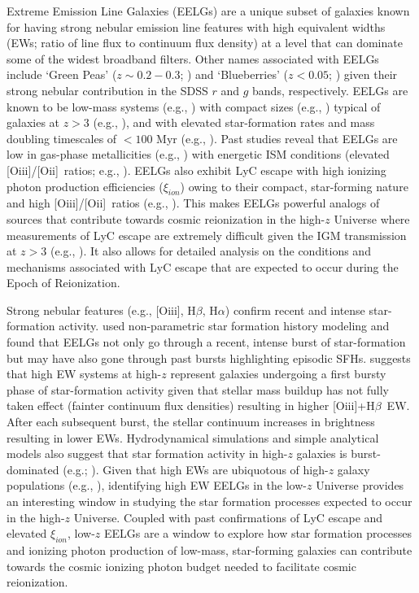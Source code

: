\documentclass[twocolumn,tight,times,linenumbers]{aastex631}
\newcommand{\halpha}{H$\alpha$}
\newcommand{\hbeta}{H$\beta$}
\newcommand{\oii}{[O{\sc ii}]}
\newcommand{\oiii}{[O{\sc iii}]}
\newcommand{\xiion}{$\xi_{ion}$}
\begin{document}
            Extreme Emission Line Galaxies (EELGs) are a unique subset of galaxies known for having strong nebular emission line features with high equivalent widths (EWs; ratio of line flux to continuum flux density) at a level that can dominate some of the widest broadband filters. Other names associated with EELGs include `Green Peas' ($z \sim 0.2 - 0.3$; \citealt{Cardamone2009,Izotov2011}) and `Blueberries' ($z < 0.05$; \citealt{Yang2017_BB}) given their strong nebular contribution in the SDSS $r$ and $g$ bands, respectively. EELGs are known to be low-mass systems (e.g., \citealt{Maseda2014,Amorin2015,Forrest2017,Yang2017_BB}) with compact sizes (e.g., \citealt{vanderWel2011,Amorin2015,Forrest2017,Yang2017_GP_sizes,Kim2021}) typical of galaxies at $z > 3$ (e.g., \citealt{Yang2022_Lilan,Ormerod2024}), and with elevated star-formation rates and mass doubling timescales of $< 100$ Myr (e.g., \citealt{Atek2011, Maseda2013, Atek2014, Amorin2015}). Past studies reveal that EELGs are low in gas-phase metallicities (e.g., \citealt{Amorin2014_VUDS,Amorin2014_highz,Jiang2019}) with energetic ISM conditions (elevated \oiii/\oii~ratios; e.g., \citealt{Izotov2018,Paalvast2018,Izotov2021_O32}). EELGs also exhibit LyC escape with high ionizing photon production efficiencies (\xiion) owing to their compact, star-forming nature and high \oiii/\oii~ratios (e.g., \citealt{Schaerer2016,Tang2019,Emami2020,Atek2022}). This makes EELGs powerful analogs of sources that contribute towards cosmic reionization in the high-$z$ Universe where measurements of LyC escape are extremely difficult given the IGM transmission at $z > 3$ (e.g., \citealt{Madau1995,Inoue2014}). It also allows for detailed analysis on the conditions and mechanisms associated with LyC escape that are expected to occur during the Epoch of Reionization.		
            
             Strong nebular features (e.g., \oiii, \hbeta, \halpha) confirm recent and intense star-formation activity. \cite{Tang2022} used non-parametric star formation history modeling and found that EELGs not only go through a recent, intense burst of star-formation but may have also gone through past bursts highlighting episodic SFHs. \cite{Cohn2018} suggests that high EW systems at high-$z$ represent galaxies undergoing a first bursty phase of star-formation activity given that stellar mass buildup has not fully taken effect (fainter continuum flux densities) resulting in higher \oiii+\hbeta~EW. After each subsequent burst, the stellar continuum increases in brightness resulting in lower EWs. Hydrodynamical simulations and simple analytical models also suggest that star formation activity in high-$z$ galaxies is burst-dominated (e.g.; \citealt{Sparre2017,Faucher2018}). Given that high EWs are ubiquotous of high-$z$ galaxy populations (e.g., \citealt{Smit2014,Khostovan2024}), identifying high EW EELGs in the low-$z$ Universe provides an interesting window in studying the star formation processes expected to occur in the high-$z$ Universe. Coupled with past confirmations of LyC escape and elevated \xiion, low-$z$ EELGs are a window to explore how star formation processes and ionizing photon production of low-mass, star-forming galaxies can contribute towards the cosmic ionizing photon budget needed to facilitate cosmic reionization. 
            
\end{document}
